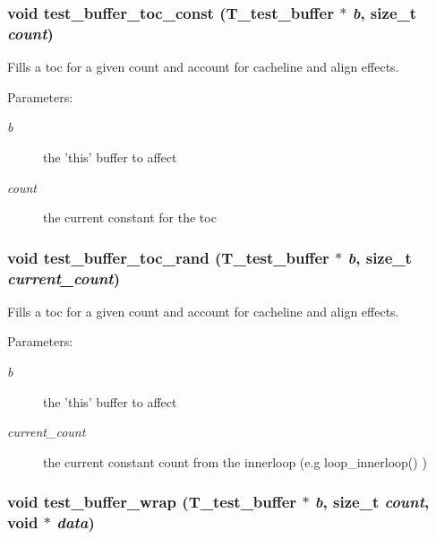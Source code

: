 \subsubsection{\setlength{\rightskip}{0pt plus 5cm}void test\_\-buffer\_\-toc\_\-const ({\bf T\_\-test\_\-buffer} $\ast$ {\em b}, size\_\-t {\em count})}\label{test__utils_8h_a43}


Fills a toc for a given count and account for cacheline and align effects.

\begin{Desc}
\item[Parameters: ]\par
\begin{description}
\item[{\em 
b}]the 'this' buffer to affect \item[{\em 
count}]the current constant for the toc \end{description}
\end{Desc}
\subsubsection{\setlength{\rightskip}{0pt plus 5cm}void test\_\-buffer\_\-toc\_\-rand ({\bf T\_\-test\_\-buffer} $\ast$ {\em b}, size\_\-t {\em current\_\-count})}\label{test__utils_8h_a44}


Fills a toc for a given count and account for cacheline and align effects.

\begin{Desc}
\item[Parameters: ]\par
\begin{description}
\item[{\em 
b}]the 'this' buffer to affect \item[{\em 
current\_\-count}]the current constant count from the innerloop (e.g loop\_\-innerloop() ) \end{description}
\end{Desc}
\subsubsection{\setlength{\rightskip}{0pt plus 5cm}void test\_\-buffer\_\-wrap ({\bf T\_\-test\_\-buffer} $\ast$ {\em b}, size\_\-t {\em count}, void $\ast$ {\em data})}\label{test__utils_8h_a50}


